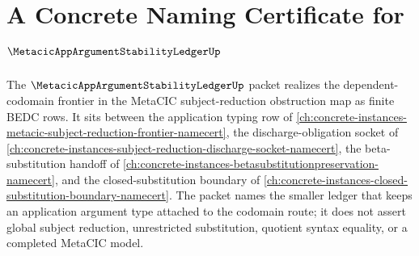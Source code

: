 \chapter{A Concrete Naming Certificate for $\MetacicAppArgumentStabilityLedgerUp$}
\label{ch:concrete-instances-metacic-app-argument-stability-ledger-namecert}

The $\MetacicAppArgumentStabilityLedgerUp$ packet realizes the dependent-codomain frontier in the MetaCIC subject-reduction obstruction map as finite BEDC rows. It sits between the application typing row of \autoref{ch:concrete-instances-metacic-subject-reduction-frontier-namecert}, the discharge-obligation socket of \autoref{ch:concrete-instances-subject-reduction-discharge-socket-namecert}, the beta-substitution handoff of \autoref{ch:concrete-instances-betasubstitutionpreservation-namecert}, and the closed-substitution boundary of \autoref{ch:concrete-instances-closed-substitution-boundary-namecert}. The packet names the smaller ledger that keeps an application argument type attached to the codomain route; it does not assert global subject reduction, unrestricted substitution, quotient syntax equality, or a completed MetaCIC model.

